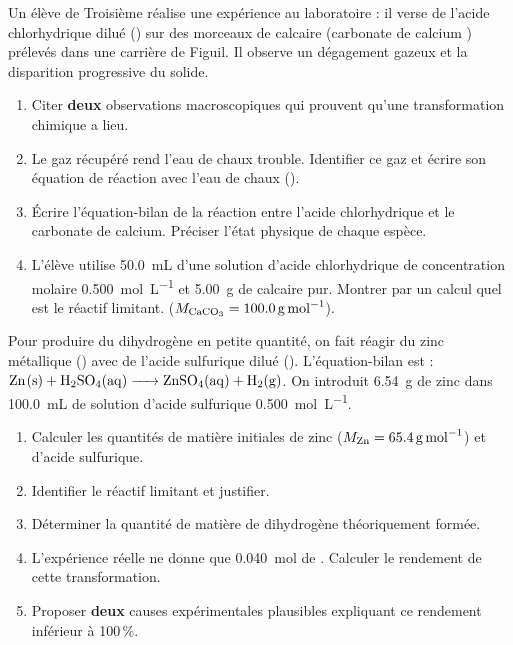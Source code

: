 \documentclass[11pt]{article}
\begin{document}
\begin{exercice}
Un élève de Troisième réalise une expérience au laboratoire : il verse de l'acide chlorhydrique dilué () sur des morceaux de calcaire (carbonate de calcium ) prélevés dans une carrière de Figuil. Il observe un dégagement gazeux et la disparition progressive du solide.
\begin{enumerate}
    \item Citer \textbf{deux} observations macroscopiques qui prouvent qu'une transformation chimique a lieu.
    \item Le gaz récupéré rend l'eau de chaux trouble. Identifier ce gaz et écrire son équation de réaction avec l'eau de chaux ().
    \item Écrire l'équation-bilan de la réaction entre l'acide chlorhydrique et le carbonate de calcium. Préciser l'état physique de chaque espèce.
    \item L'élève utilise \SI{50,0}{mL} d'une solution d'acide chlorhydrique de concentration molaire \SI{0,500}{mol.L^{-1}} et \SI{5,00}{g} de calcaire pur. Montrer par un calcul quel est le réactif limitant. ($M_{\ce{CaCO3}} = \SI{100,0}{g.mol^{-1}}$).
\end{enumerate}
\end{exercice}

\begin{exercice}
Pour produire du dihydrogène  en petite quantité, on fait réagir du zinc métallique () avec de l'acide sulfurique dilué (). L'équation-bilan est : $\ce{Zn(s) + H2SO4(aq) -> ZnSO4(aq) + H2(g)}$.
On introduit \SI{6,54}{g} de zinc dans \SI{100,0}{mL} de solution d'acide sulfurique \SI{0,500}{mol.L^{-1}}.
\begin{enumerate}
    \item Calculer les quantités de matière initiales de zinc ($M_{\ce{Zn}} = \SI{65,4}{g.mol^{-1}}$) et d'acide sulfurique.
    \item Identifier le réactif limitant et justifier.
    \item Déterminer la quantité de matière de dihydrogène théoriquement formée.
    \item L'expérience réelle ne donne que \SI{0,040}{mol} de . Calculer le rendement de cette transformation.
    \item Proposer \textbf{deux} causes expérimentales plausibles expliquant ce rendement inférieur à 100\,\%.
\end{enumerate}
\end{exercice}
\end{document}
